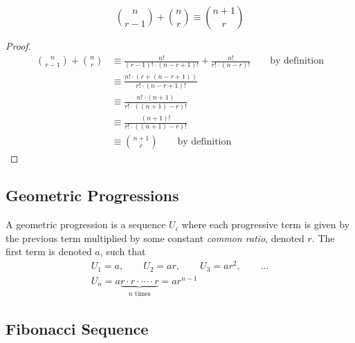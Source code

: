 \begin{lemma} \label{lem_bin_coef_sum}
\begin{equation*}
\binom n{r - 1} + \binom nr \equiv \binom{n + 1} r
\end{equation*}
\end{lemma}
\begin{proof}
\begin{align*}
\binom n{r - 1} + \binom nr &\equiv \frac{n!}{(r - 1)! \cdot (n - r + 1)!}
                                 + \frac{n!}{r! \cdot (n - r)!}
                                    \qquad \text{by definition} \\
    &\equiv \frac{n!\cdot(r + (n - r + 1))}{r! \cdot (n - r + 1)!} \\
    &\equiv \frac{n! \cdot (n + 1)}{r! \cdot ((n + 1) - r)!} \\
    &\equiv \frac{(n + 1)!}{r! \cdot ((n + 1) - r)!} \\
    &\equiv \binom{n + 1} r \qquad \text{by definition} \tag*{\qedhere}
\end{align*}
\end{proof}

\subsection{Geometric Progressions} \label{sec_seq_GP}

A geometric progression is a sequence \(U_i\) where each progressive term is
given by the previous term multiplied by some constant \emph{common ratio},
denoted \(r\). The first term is denoted \(a\), such that
\begin{gather*}
U_1 = a, \qquad U_2 = ar, \qquad U_3 = ar^2, \qquad \dots\\
U_n = a\underbrace{r \cdot r \cdot \dotsb \cdot r}_{\text{\(n\) times}}
    = ar^{n - 1}
\end{gather*}

\subsection{Fibonacci Sequence}


